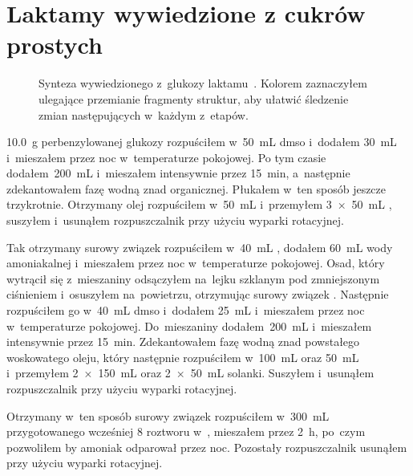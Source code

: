 \section{Laktamy wywiedzione z cukrów prostych}\label{experimental:lactams}
\begin{figure}
	
	\caption{
		Synteza wywiedzionego z~glukozy laktamu~.
		Kolorem zaznaczyłem ulegające przemianie fragmenty struktur,
			aby ułatwić śledzenie zmian następujących w~każdym z~etapów.
	} \label{sch:gluco-synthesis}
\end{figure}
\SI{10.0}{\gram} perbenzylowanej glukozy rozpuściłem w~\SI{50}{\mL} \gls{dmso}
	i~dodałem \SI{30}{\mL}  i~mieszałem przez noc w~temperaturze pokojowej.
Po tym czasie dodałem~\SI{200}{\mL}  i~mieszałem intensywnie przez \SI{15}{\minute},
	a~następnie zdekantowałem fazę wodną znad organicznej.
Płukałem w~ten sposób jeszcze trzykrotnie.
Otrzymany olej rozpuściłem w~\SI{50}{\mL}  i~przemyłem 
	\SI[product-units = single]{3 x 50}{\mL} , suszyłem  i~usunąłem rozpuszczalnik
	przy użyciu wyparki rotacyjnej.

Tak otrzymany surowy związek  rozpuściłem w~\SI{40}{\mL} ,
	dodałem \SI{60}{\mL} wody amoniakalnej i~mieszałem przez noc w~temperaturze pokojowej.
Osad, który wytrącił się z~mieszaniny odsączyłem na~lejku szklanym pod zmniejszonym ciśnieniem
	i~osuszyłem na~powietrzu, otrzymując surowy związek .
Następnie rozpuściłem go w~\SI{40}{\mL} \gls{dmso} i~dodałem \SI{25}{\mL} 
	i~mieszałem przez noc w~temperaturze pokojowej.
Do~mieszaniny dodałem~\SI{200}{\mL}  i~mieszałem intensywnie przez \SI{15}{\minute}.
Zdekantowałem fazę wodną znad powstałego woskowatego oleju, który następnie rozpuściłem
	w~\SI{100}{\mL}  oraz \SI{50}{\mL}  i~przemyłem
	\SI[product-units = single]{2 x 150}{\mL}  oraz
	\SI[product-units = single]{2 x 50}{\mL} solanki.
Suszyłem  i~usunąłem rozpuszczalnik przy użyciu wyparki rotacyjnej.

Otrzymany w~ten sposób surowy związek  rozpuściłem w~\SI{300}{\mL}
	przygotowanego wcześniej \SI{8}{\Molar} roztworu  w~,
	mieszałem przez \SI{2}{\hour}, po~czym pozwoliłem by amoniak odparował przez noc.
Pozostały rozpuszczalnik usunąłem przy użyciu wyparki rotacyjnej.

